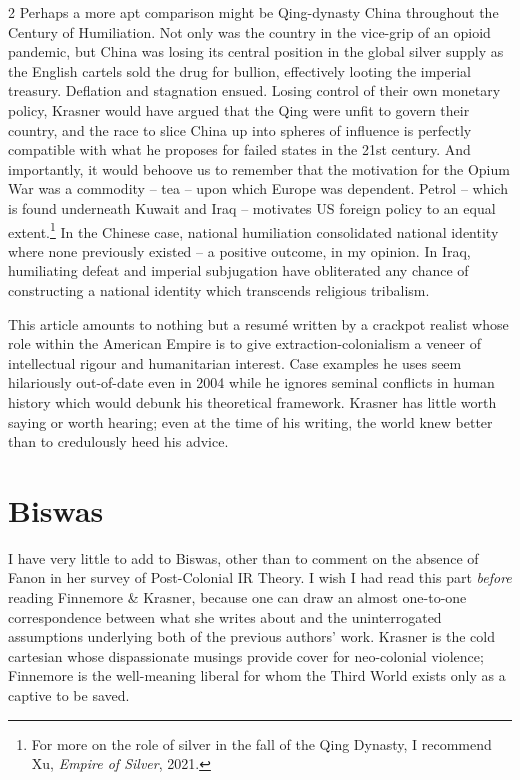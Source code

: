 \documentclass[letterpaper,12pt,twoside]{article}
\begin{document}
\begin {multicols}{2}
Perhaps a more apt comparison might be Qing-dynasty China throughout the Century of Humiliation. Not only was the country in the vice-grip of an opioid pandemic, but China was losing its central position in the global silver supply as the English cartels sold the drug for bullion, effectively looting the imperial treasury. Deflation and stagnation ensued. Losing control of their own monetary policy, Krasner would have argued that the Qing were unfit to govern their country, and the race to slice China up into spheres of influence is perfectly compatible with what he proposes for failed states in the 21st century. And importantly, it would behoove us to remember that the motivation for the Opium War was a commodity – tea – upon which Europe was dependent. Petrol – which is found underneath Kuwait and Iraq –  motivates US foreign policy to an equal extent.\footnote{For more on the role of silver in the fall of the Qing Dynasty, I recommend Xu, \textit{Empire of Silver}, 2021.} In the Chinese case, national humiliation consolidated national identity where none previously existed – a positive outcome, in my opinion. In Iraq, humiliating defeat and imperial subjugation have obliterated any chance of constructing a national identity which transcends religious tribalism.

This article amounts to nothing but a resumé written by a crackpot realist whose role within the American Empire is to give extraction-colonialism a veneer of intellectual rigour and humanitarian interest. Case examples he uses seem hilariously out-of-date even in 2004 while he ignores seminal conflicts in human history which would debunk his theoretical framework. Krasner has little worth saying or worth hearing;  even at the time of his writing, the world knew better than to credulously heed his advice.

\section*{Biswas}

I have very little to add to Biswas, other than to comment on the absence of Fanon in her survey of Post-Colonial IR Theory. I wish I had read this part \textit{before} reading Finnemore \& Krasner, because one can draw an almost one-to-one correspondence between what she writes about and the uninterrogated assumptions underlying both of the previous authors' work. Krasner is the cold cartesian whose dispassionate musings provide cover for neo-colonial violence; Finnemore is the well-meaning liberal for whom the Third World exists only as a captive to be saved.


\end{multicols}
\end{document}
